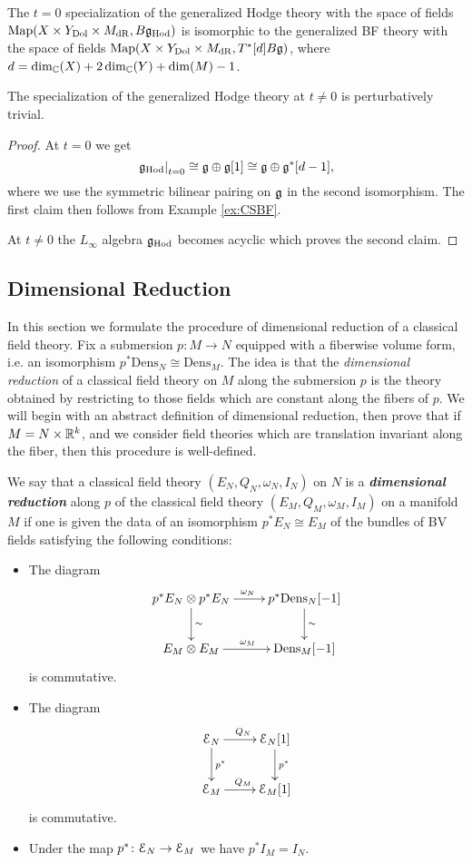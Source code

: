 \documentclass[10pt, oneside]{article}
\newcommand{\Dens}{\mathrm{Dens}}
\newcommand{\Hod}{\mathrm{Hod}}
\newcommand{\defterm}[1]{\textbf{\emph{#1}}}
\begin{document}
\begin{prop}
The $t=0$ specialization of the generalized Hodge theory with the space of fields $\map(X\times Y_{\mr{Dol}}\times M_{\mr{dR}}, B \fg_\Hod)$ is isomorphic to the generalized BF theory with the space of fields $\operatorname{Map}(X\times Y_{\mathrm{Dol}}\times M_{\mathrm{dR}}, T^*[d] B \mathfrak g)$, where $d = \dim_\mathbb C(X) + 2\dim_\mathbb C(Y) + \dim(M) - 1$.

The specialization of the generalized Hodge theory at $t\neq 0$ is perturbatively trivial.
\label{prop:Hodgetheoryspecialization}
\end{prop}
\begin{proof}
At $t=0$ we get
\[\left.\fg_\Hod\right|_{t=0}\cong \fg\oplus \fg[1]\cong \fg\oplus \fg^*[d-1],\]
where we use the symmetric bilinear pairing on $\mathfrak g$ in the second isomorphism. The first claim then follows from Example \ref{ex:CSBF}.

At $t\neq 0$ the $L_\infty$ algebra $\fg_\Hod$ becomes acyclic which proves the second claim.
\end{proof}


\subsection{Dimensional Reduction} \label{dim_red_section}

In this section we formulate the procedure of dimensional reduction of a classical field theory. Fix a submersion $p\colon M\rightarrow N$ equipped with a fiberwise volume form, i.e. an isomorphism $p^*\Dens_N\cong \Dens_M$.  The idea is that the \emph{dimensional reduction} of a classical field theory on $M$ along the submersion $p$ is the theory obtained by restricting to those fields which are constant along the fibers of $p$.  We will begin with an abstract definition of dimensional reduction, then prove that if $M = N \times \mathbb R^k$, and we consider field theories which are translation invariant along the fiber, then this procedure is well-defined.

\begin{definition}
We say that a classical field theory $(E_N, Q_N, \omega_N, I_N)$ on $N$ is a \defterm{dimensional reduction} along $p$ of the classical field theory $(E_M, Q_M, \omega_M, I_M)$ on a manifold $M$ if one is given the data of an isomorphism $p^* E_N\cong E_M$ of the bundles of BV fields satisfying the following conditions:
\begin{itemize}
\item The diagram
\[
\xymatrix{
p^* E_N\otimes p^* E_N \ar^{\omega_N}[r] \ar^{\sim}[d] & p^*\Dens_N[-1] \ar^{\sim}[d] \\
E_M\otimes E_M \ar^{\omega_M}[r] & \Dens_M[-1]
}
\]
is commutative.

\item The diagram
\[
\xymatrix{
\cE_N \ar^{Q_N}[r] \ar^{p^*}[d] & \cE_N[1] \ar^{p^*}[d] \\
\cE_M \ar^{Q_M}[r] & \cE_M[1]
}
\]
is commutative.

\item Under the map $p^*\colon \mathcal E_N\rightarrow \mathcal E_M$ we have $p^* I_M = I_N$.
\end{itemize}
\end{definition}
\end{document}
